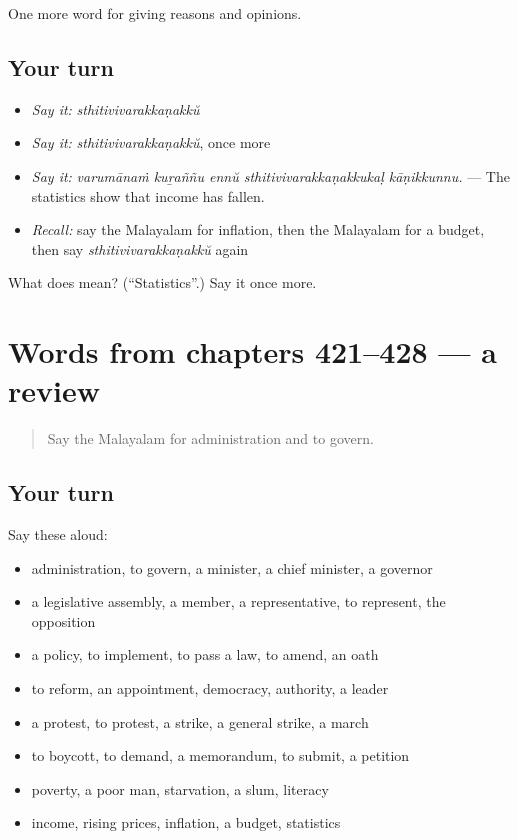 \begin{grammarlens}[title={What you've built}]
One more word for giving reasons and opinions.
\end{grammarlens}

\subsection*{Your turn}
\begin{itemize}
\raggedright
  \item \emph{Say it:} \emph{sthitivivarakkaṇakkŭ}
  \item \emph{Say it:} \emph{sthitivivarakkaṇakkŭ}, once more
  \item \emph{Say it:} \emph{varumānaṁ kuṟaññu ennŭ sthitivivarakkaṇakkukaḷ kāṇikkunnu.} — The statistics show that income has fallen.
  \item \emph{Recall:} say the Malayalam for inflation, then the Malayalam for a budget, then say \emph{sthitivivarakkaṇakkŭ} again
\end{itemize}

\begin{tcolorbox}[breakable,colback=teal!4,colframe=teal!35!black,title={Before you move on}]
What does  mean? (\textquotedblleft{}Statistics\textquotedblright{}.) Say it once more.
\end{tcolorbox}
\section[(dialogue)]{Words from chapters 421–428 — a review}

\label{lesson:ML-R428-review-421-428}



\begin{quote}
Say the Malayalam for administration and to govern.
\end{quote}

\subsection*{Your turn}
Say these aloud:

\begin{itemize}
\raggedright
  \item administration, to govern, a minister, a chief minister, a governor
  \item a legislative assembly, a member, a representative, to represent, the opposition
  \item a policy, to implement, to pass a law, to amend, an oath
  \item to reform, an appointment, democracy, authority, a leader
  \item a protest, to protest, a strike, a general strike, a march
  \item to boycott, to demand, a memorandum, to submit, a petition
  \item poverty, a poor man, starvation, a slum, literacy
  \item income, rising prices, inflation, a budget, statistics
\end{itemize}

